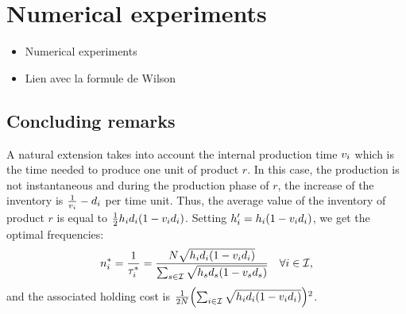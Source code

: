 \section{Numerical experiments}

\begin{itemize}
  \item Numerical experiments
  \item Lien avec la formule de Wilson
\end{itemize}


\subsection{Concluding remarks}



A natural extension takes into account the internal production time $v_i$ which is the time needed to produce one unit of product $r$. In this case, the production is not instantaneous and during the production phase of $r$, the increase of the inventory is $\frac{1}{v_i}-d_i$ per time unit. Thus, the average value of the inventory of product $r$ is equal to $\frac{1}{2}\holding_i\demand_i\bracket{1-\internal_i\demand_i}$. Setting $\holding_i'=\holding_i\bracket{1-\internal_i\demand_i}$, we get the optimal frequencies:
\begin{equation}
  \freq_i^* = \frac{1}{\cover_i^*}
            = \frac{\nbsetups\sqrt{\holding_i\demand_i\bracket{1-\internal_i\demand_i}}}{\sum_{s\in\REF}\sqrt{\holding_s\demand_s\bracket{1-\internal_s\demand_s}}}
            \quad \forall i\in\REF,
\end{equation}
and the associated holding cost is $\frac{1}{2\nbsetups}\bracket{\sum_{i\in\REF}\sqrt{\holding_i\demand_i\bracket{1-\internal_i\demand_i}}}^2$.

